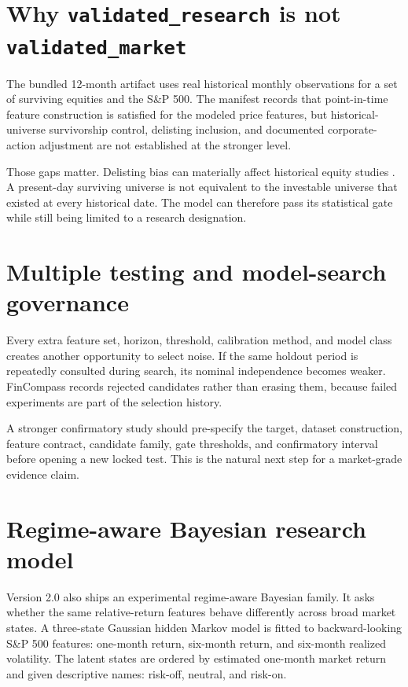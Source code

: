 \documentclass[11pt]{article}
\begin{document}
\section{Why \texttt{validated\_research} is not \texttt{validated\_market}}

The bundled 12-month artifact uses real historical monthly observations for a set of surviving equities and the S\&P 500. The manifest records that point-in-time feature construction is satisfied for the modeled price features, but historical-universe survivorship control, delisting inclusion, and documented corporate-action adjustment are not established at the stronger level.

Those gaps matter. Delisting bias can materially affect historical equity studies \citep{shumway1997delisting}. A present-day surviving universe is not equivalent to the investable universe that existed at every historical date. The model can therefore pass its statistical gate while still being limited to a research designation.

\section{Multiple testing and model-search governance}

Every extra feature set, horizon, threshold, calibration method, and model class creates another opportunity to select noise. If the same holdout period is repeatedly consulted during search, its nominal independence becomes weaker. FinCompass records rejected candidates rather than erasing them, because failed experiments are part of the selection history.

A stronger confirmatory study should pre-specify the target, dataset construction, feature contract, candidate family, gate thresholds, and confirmatory interval before opening a new locked test. This is the natural next step for a market-grade evidence claim.


\section{Regime-aware Bayesian research model}
Version 2.0 also ships an experimental regime-aware Bayesian family. It asks whether the same relative-return features behave differently across broad market states. A three-state Gaussian hidden Markov model is fitted to backward-looking S\&P 500 features: one-month return, six-month return, and six-month realized volatility. The latent states are ordered by estimated one-month market return and given descriptive names: risk-off, neutral, and risk-on.
\end{document}
